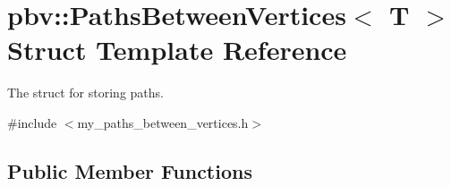 \hypertarget{structpbv_1_1_paths_between_vertices}{}\section{pbv\+:\+:Paths\+Between\+Vertices$<$ T $>$ Struct Template Reference}
\label{structpbv_1_1_paths_between_vertices}


The struct for storing paths.  




{\ttfamily \#include $<$my\+\_\+paths\+\_\+between\+\_\+vertices.\+h$>$}

\subsection*{Public Member Functions}
